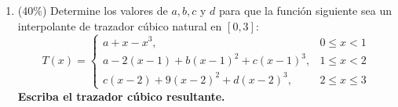 \documentclass[11pt]{article}
\begin{document}
\begin{enumerate}
\item{} (40\%) Determine los valores de $a, b, c$ y $d$ para que la función siguiente sea un interpolante de trazador cúbico natural en $[0,3]$:
\[
T(x) = \left\{
\begin{array}{ll}
a+x-x^3, & 0\leq x<1\\
a-2(x-1)+b(x-1)^2+c(x-1)^3, & 1\leq x<2\\
c(x-2)+9(x-2)^2+d(x-2)^3, & 2\leq x\leq 3
\end{array}
\right.
\]
\noindent \textbf{Escriba el trazador cúbico resultante.}

\vspace{6cm}
\end{enumerate}

\examfooter
\end{document}
